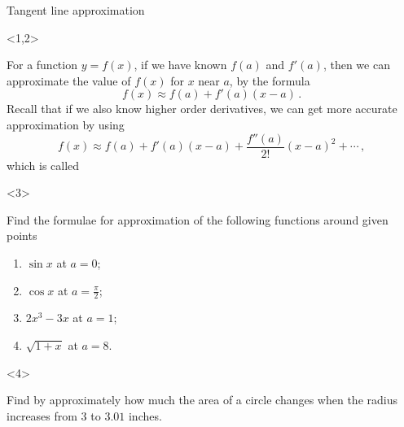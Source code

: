 \begin{frame}{Tangent line approximation}

\begin{onlyenv}<1,2>


For a function $y=f\left(x\right)$, if we have known $f\left(a\right)$
and $f'\left(a\right)$, then we can approximate the value of $f\left(x\right)$
for $x$ near $a$, by the formula
\[
f\left(x\right)\approx f\left(a\right)+f'\left(a\right)\left(x-a\right)\,.
\]
Recall that if we also know higher order derivatives, we can get more
accurate approximation by using
\[
f\left(x\right)\approx f\left(a\right)+f'\left(a\right)\left(x-a\right)+\frac{f''\left(a\right)}{2!}\left(x-a\right)^{2}+\cdots\,,
\]
which is called 

\end{onlyenv}



\begin{onlyenv}<3>

\begin{example}
Find the formulae for approximation of the following functions around
given points
\begin{enumerate}
\item $\sin x$ at $a=0$;
\item $\cos x$ at $a=\frac{\pi}{2}$;
\item $2x^{3}-3x$ at $a=1$;
\item $\sqrt{1+x}$ at $a=8$.
\end{enumerate}

\end{example}

\end{onlyenv}



\begin{onlyenv}<4>

\begin{example}
Find by approximately how much the area of a circle changes when the
radius increases from $3$ to $3.01$ inches.
\end{example}

\end{onlyenv}

\end{frame}

